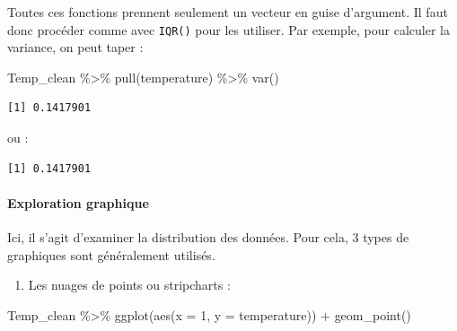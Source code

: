 \documentclass[
  a4paper,
]{article}
\newenvironment{Shaded}{\begin{snugshade}}{\end{snugshade}}
\newcommand{\AttributeTok}[1]{\textcolor[rgb]{0.00,0.34,0.68}{#1}}
\newcommand{\DecValTok}[1]{\textcolor[rgb]{0.69,0.50,0.00}{#1}}
\newcommand{\FunctionTok}[1]{\textcolor[rgb]{0.39,0.29,0.61}{#1}}
\newcommand{\NormalTok}[1]{\textcolor[rgb]{0.12,0.11,0.11}{#1}}
\newcommand{\SpecialCharTok}[1]{\textcolor[rgb]{0.24,0.68,0.91}{#1}}
\providecommand{\tightlist}{%
  \setlength{\itemsep}{0pt}\setlength{\parskip}{0pt}}
\begin{document}
Toutes ces fonctions prennent seulement un vecteur en guise d'argument. Il faut donc procéder comme avec \texttt{IQR()} pour les utiliser. Par exemple, pour calculer la variance, on peut taper :

\begin{Shaded}
\begin{Highlighting}[]
\NormalTok{Temp\_clean }\SpecialCharTok{\%\textgreater{}\%} 
  \FunctionTok{pull}\NormalTok{(temperature) }\SpecialCharTok{\%\textgreater{}\%} 
  \FunctionTok{var}\NormalTok{()}
\end{Highlighting}
\end{Shaded}

\begin{verbatim}
[1] 0.1417901
\end{verbatim}

ou :

\begin{Shaded}
\end{Shaded}

\begin{verbatim}
[1] 0.1417901
\end{verbatim}

\hypertarget{exploration-graphique}{%
\paragraph{Exploration graphique}\label{exploration-graphique}}

Ici, il s'agit d'examiner la distribution des données. Pour cela, 3 types de graphiques sont généralement utilisés.

\begin{enumerate}
\def\labelenumi{\arabic{enumi}.}
\tightlist
\item
  Les nuages de points ou stripcharts :
\end{enumerate}

\begin{Shaded}
\begin{Highlighting}[]
\NormalTok{Temp\_clean }\SpecialCharTok{\%\textgreater{}\%} 
  \FunctionTok{ggplot}\NormalTok{(}\FunctionTok{aes}\NormalTok{(}\AttributeTok{x =} \DecValTok{1}\NormalTok{, }\AttributeTok{y =}\NormalTok{ temperature)) }\SpecialCharTok{+}
  \FunctionTok{geom\_point}\NormalTok{()}
\end{Highlighting}
\end{Shaded}
\end{document}
